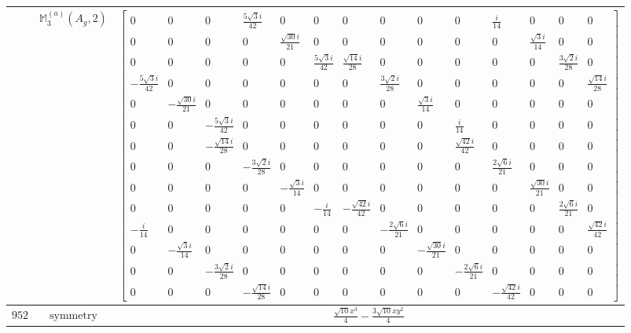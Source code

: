 \documentclass[fleqn,8pt,landscape]{jsarticle}
\begin{document}
\begin{longtable}{ccc}
$  $ & $ \mathbb{M}_{3}^{(a)}(A_{g},2) $ & $ \begin{bmatrix} 0 & 0 & 0 & \frac{5 \sqrt{3} i}{42} & 0 & 0 & 0 & 0 & 0 & 0 & \frac{i}{14} & 0 & 0 & 0 \\ 0 & 0 & 0 & 0 & \frac{\sqrt{30} i}{21} & 0 & 0 & 0 & 0 & 0 & 0 & \frac{\sqrt{3} i}{14} & 0 & 0 \\ 0 & 0 & 0 & 0 & 0 & \frac{5 \sqrt{3} i}{42} & \frac{\sqrt{14} i}{28} & 0 & 0 & 0 & 0 & 0 & \frac{3 \sqrt{2} i}{28} & 0 \\ - \frac{5 \sqrt{3} i}{42} & 0 & 0 & 0 & 0 & 0 & 0 & \frac{3 \sqrt{2} i}{28} & 0 & 0 & 0 & 0 & 0 & \frac{\sqrt{14} i}{28} \\ 0 & - \frac{\sqrt{30} i}{21} & 0 & 0 & 0 & 0 & 0 & 0 & \frac{\sqrt{3} i}{14} & 0 & 0 & 0 & 0 & 0 \\ 0 & 0 & - \frac{5 \sqrt{3} i}{42} & 0 & 0 & 0 & 0 & 0 & 0 & \frac{i}{14} & 0 & 0 & 0 & 0 \\ 0 & 0 & - \frac{\sqrt{14} i}{28} & 0 & 0 & 0 & 0 & 0 & 0 & \frac{\sqrt{42} i}{42} & 0 & 0 & 0 & 0 \\ 0 & 0 & 0 & - \frac{3 \sqrt{2} i}{28} & 0 & 0 & 0 & 0 & 0 & 0 & \frac{2 \sqrt{6} i}{21} & 0 & 0 & 0 \\ 0 & 0 & 0 & 0 & - \frac{\sqrt{3} i}{14} & 0 & 0 & 0 & 0 & 0 & 0 & \frac{\sqrt{30} i}{21} & 0 & 0 \\ 0 & 0 & 0 & 0 & 0 & - \frac{i}{14} & - \frac{\sqrt{42} i}{42} & 0 & 0 & 0 & 0 & 0 & \frac{2 \sqrt{6} i}{21} & 0 \\ - \frac{i}{14} & 0 & 0 & 0 & 0 & 0 & 0 & - \frac{2 \sqrt{6} i}{21} & 0 & 0 & 0 & 0 & 0 & \frac{\sqrt{42} i}{42} \\ 0 & - \frac{\sqrt{3} i}{14} & 0 & 0 & 0 & 0 & 0 & 0 & - \frac{\sqrt{30} i}{21} & 0 & 0 & 0 & 0 & 0 \\ 0 & 0 & - \frac{3 \sqrt{2} i}{28} & 0 & 0 & 0 & 0 & 0 & 0 & - \frac{2 \sqrt{6} i}{21} & 0 & 0 & 0 & 0 \\ 0 & 0 & 0 & - \frac{\sqrt{14} i}{28} & 0 & 0 & 0 & 0 & 0 & 0 & - \frac{\sqrt{42} i}{42} & 0 & 0 & 0 \end{bmatrix} $ \\ \hline
$ 952 $ & $ \text{symmetry} $ & $ \frac{\sqrt{10} x^{3}}{4} - \frac{3 \sqrt{10} x y^{2}}{4} $ \\

\end{longtable}
\end{document}
